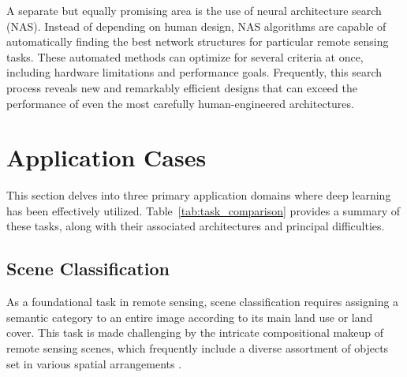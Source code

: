 \documentclass[12pt,a4paper]{article}
\begin{document}
A separate but equally promising area is the use of neural architecture search (NAS). Instead of depending on human design, NAS algorithms are capable of automatically finding the best network structures for particular remote sensing tasks. These automated methods can optimize for several criteria at once, including hardware limitations and performance goals. Frequently, this search process reveals new and remarkably efficient designs that can exceed the performance of even the most carefully human-engineered architectures.

\section{Application Cases}
\label{sec:applications}

This section delves into three primary application domains where deep learning has been effectively utilized. Table~\ref{tab:task_comparison} provides a summary of these tasks, along with their associated architectures and principal difficulties.

\begin{table}[h!]
\centering
\caption{Comparison of Major Deep Learning Tasks in Remote Sensing.}
\label{tab:task_comparison}
\end{table}


\subsection{Scene Classification}
As a foundational task in remote sensing, scene classification requires assigning a semantic category to an entire image according to its main land use or land cover. This task is made challenging by the intricate compositional makeup of remote sensing scenes, which frequently include a diverse assortment of objects set in various spatial arrangements \cite{xia2017aid}.
\end{document}
